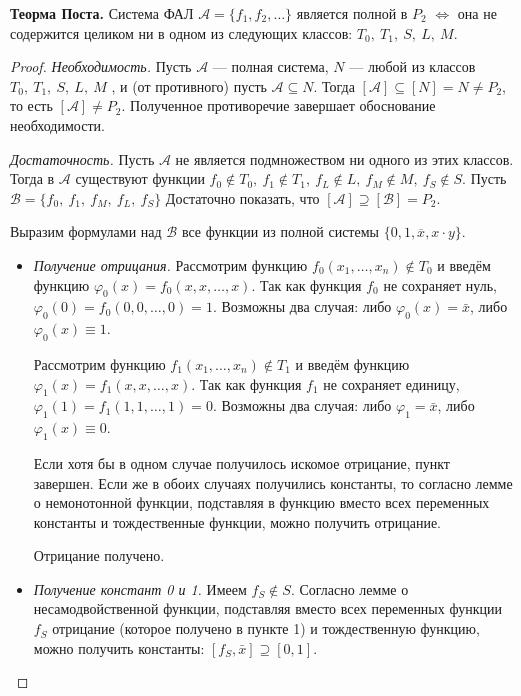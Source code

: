 \textbf{Теорма Поста.}
Система ФАЛ $\mathcal{A} = \{f_1, f_2, \dots\}$ является полной в $P_2$ $\iff$ она не содержится целиком ни в одном из следующих классов: $T_0,~T_1,~S,~L,~M$.

\begin{proof}
\textit{Необходимость.} 
Пусть $\mathcal{A}$ --- полная система, $N$ --- любой из классов $T_0,~T_1,~S,~L,~M$ , и (от противного) пусть $\mathcal{A} \subseteq N$.
Тогда $[\mathcal{A}] \subseteq [N] = N \neq P_2$, то есть $[\mathcal{A}] \neq P_2$.
Полученное противоречие завершает обоснование необходимости.

\textit{Достаточность.}
Пусть $\mathcal{A}$ не является подмножеством ни одного из этих классов. 
Тогда в $\mathcal{A}$ существуют функции $f_0 \notin T_0,~f_1 \notin T_1,~f_L \notin L,~f_M \notin M,~f_S \notin S$. Пусть $\mathcal{B} = \{f_0,~f_1,~f_M,~f_L,~f_S\}$ Достаточно показать, что $[\mathcal{A}] \supseteq [\mathcal{B}] = P_2$.

Выразим формулами над $\mathcal{B}$ все функции из полной системы $\{0,1,\overline{x}, x \cdot y\}$.
\begin{itemize}
    \item \textit{Получение отрицания.} 
    Рассмотрим функцию $f_0(x_1, \dots ,x_n) \notin T_0$ и введём функцию $\varphi_0(x) = f_0(x, x, \dots, x)$. 
    Так как функция $f_0$ не сохраняет нуль, $\varphi_0(0) = f_0(0, 0, \dots, 0) = 1$. 
    Возможны два случая: либо $\varphi_0(x) = \bar{x}$, либо $\varphi_0(x) \equiv 1$.
    
    Рассмотрим функцию $f_1(x_1, \dots, x_n) \notin T_1$ и введём функцию $\varphi_1(x) = f_1(x, x, \dots, x)$. 
    Так как функция $f_1$ не сохраняет единицу, $\varphi_1(1) = f_1 (1, 1, \dots, 1) = 0$. 
    Возможны два случая: либо $\varphi_1 = \bar{x}$, либо $\varphi_1(x) \equiv 0$.
    
    Если хотя бы в одном случае получилось искомое отрицание, пункт завершен.
    Если же в обоих случаях получились константы, то согласно лемме о немонотонной функции, подставляя в функцию вместо всех переменных константы и тождественные функции, можно получить отрицание.
    
    Отрицание получено.
    \item \textit{Получение констант 0 и 1.}
    Имеем $f_S \notin S$. 
    Согласно лемме о несамодвойственной функции, подставляя вместо всех переменных функции $f_S$ отрицание (которое получено в пункте 1) и тождественную функцию, можно получить константы: $[f_S , \bar{x}] \supseteq [0, 1]$. 
    

\end{itemize}
\end{proof}
